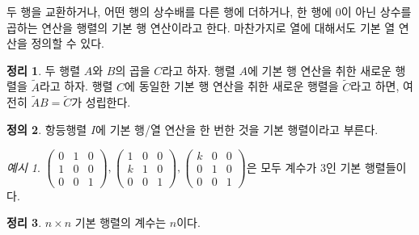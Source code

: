 \documentclass[unfonts,oneside,a4paper]{oblivoir}
\theoremstyle{definition}
\newtheorem{definition}{정의}[section]
\theoremstyle{theorem}
\newtheorem{theorem}[definition]{정리}
\theoremstyle{theorem}
\theoremstyle{remark}
\theoremstyle{remark}
\theoremstyle{remark}
\newtheorem*{example}{예시}
\theoremstyle{remark}
\begin{document}
두 행을 교환하거나, 어떤 행의 상수배를 다른 행에 더하거나, 한 행에 0이 아닌 상수를 곱하는 연산을 행렬의 기본 행 연산이라고 한다.
마찬가지로 열에 대해서도 기본 열 연산을 정의할 수 있다.

\begin{theorem} \label{thm:elementary_op}
    두 행렬 $A$와 $B$의 곱을 $C$라고 하자.
    행렬 $A$에 기본 행 연산을 취한 새로운 행렬을 $\tilde A$라고 하자.
    행렬 $C$에 동일한 기본 행 연산을 취한 새로운 행렬을 $\tilde C$라고 하면, 여전히 $\tilde A B = \tilde C$가 성립한다.
\end{theorem}

\begin{definition}
    항등행렬 $I$에 기본 행/열 연산을 한 번한 것을 기본 행렬이라고 부른다.
\end{definition}

\begin{example}
    $\begin{pmatrix}
        0 & 1 & 0\\
        1 & 0 & 0\\
        0 & 0 & 1
        \end{pmatrix}, \begin{pmatrix}
        1 & 0 & 0\\
        k & 1 & 0\\
        0 & 0 & 1
        \end{pmatrix}, \begin{pmatrix}
        k & 0 & 0\\
        0 & 1 & 0\\
        0 & 0 & 1
    \end{pmatrix}$은 모두 계수가 3인 기본 행렬들이다.
\end{example}

\begin{theorem} \label{thm:rank_elementary}
    $n \times n$ 기본 행렬의 계수는 $n$이다.
\end{theorem}
\end{document}
